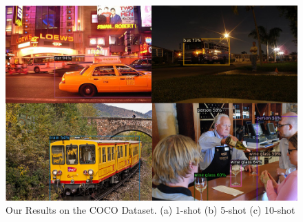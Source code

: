 \documentclass{article}
\begin{document}
\begin{figure}[h]
\begin{minipage}{0.47\textwidth}
  \includegraphics[width=\textwidth, height=0.17\textheight]{./../../figures/10shot.png}
  \subcaption{}
  \end{minipage}
  \caption{Our Results on the COCO Dataset. (a) 1-shot (b) 5-shot (c) 10-shot }
  \label{finetuning}
\end{figure}
\end{document}
